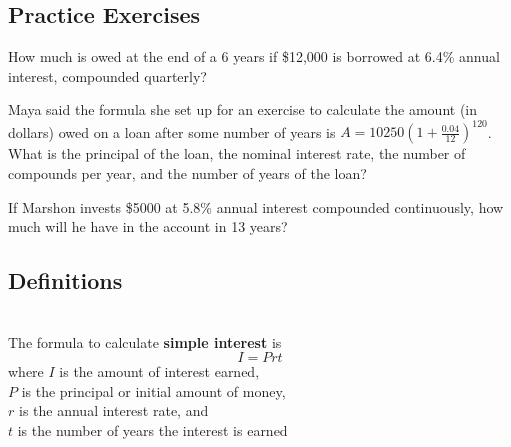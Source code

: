 

\newpage


\subsection*{Practice Exercises} \label{practice-exponential-compounding}

\begin{myPractice}
How much is owed at the end of a 6 years if \$12,000 is borrowed at 6.4\% annual interest, compounded quarterly?
\vfill
\end{myPractice}

\begin{myPractice}
Maya said the formula she set up for an exercise to calculate the amount (in dollars) owed on a loan after some number of years is $A = 10250\left(1+\frac{0.04}{12}\right)^{120}$.  What is the principal of the loan, the nominal interest rate, the number of compounds per year, and the number of years of the loan?
\vfill
\end{myPractice}


\begin{myPractice}
If Marshon invests \$5000 at 5.8\% annual interest compounded continuously, how much will he have in the account in 13 years?
\vfill
\end{myPractice}



\newpage

\subsection*{Definitions} \label{def-exponential-compounding}

\begin{myDefinition}~\\[0.5mm]
The formula to calculate {\bf simple interest} is $${I = Prt}$$
where $I$ is the amount of interest earned, \\
$P$ is the principal or initial amount of money, \\
$r$ is the annual interest rate, and \\
$t$ is the number of years the interest is earned 
\end{myDefinition}


